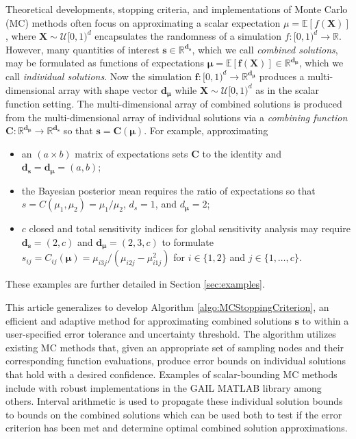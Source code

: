 \documentclass[graybox]{svmult}
\begin{document}
Theoretical developments, stopping criteria, and implementations of Monte Carlo (MC) methods often focus on approximating a scalar expectation $\mu = \mathbb{E}[f(\boldsymbol{X})]$, where $\boldsymbol{X} \sim \mathcal{U}[0,1)^d$ encapsulates the randomness of a simulation $f: [0,1)^d \to \mathbb{R}$. However, many quantities of interest $\boldsymbol{s} \in \mathbb{R}^{\boldsymbol{d}_{\boldsymbol{s}}}$, which we call \emph{combined solutions}, may be formulated as functions of expectations $\boldsymbol{\mu} = \mathbb{E}[\boldsymbol{f}(\boldsymbol{X})] \in \mathbb{R}^{\boldsymbol{d}_{\boldsymbol{\mu}}}$, which we call \emph{individual solutions}. Now the simulation $\boldsymbol{f}: [0,1)^{d} \to \mathbb{R}^{\boldsymbol{d}_{\boldsymbol{\mu}}}$ produces a multi-dimensional array with shape vector $\boldsymbol{d}_{\boldsymbol{\mu}}$ while $\boldsymbol{X} \sim \mathcal{U}[0,1)^d$ as in the scalar function setting. The multi-dimensional array of combined solutions is produced from the multi-dimensional array of individual solutions via a \emph{combining function} $\boldsymbol{C}: \mathbb{R}^{\boldsymbol{d}_{\boldsymbol{\mu}}} \to \mathbb{R}^{\boldsymbol{d}_{\boldsymbol{s}}}$ so that $\boldsymbol{s} = \boldsymbol{C}(\boldsymbol{\mu})$.
For example, approximating
\begin{itemize}
    \item an $(a \times b)$ matrix of expectations sets $\boldsymbol{C}$ to the identity and $\boldsymbol{d}_{\boldsymbol{s}} = \boldsymbol{d}_{\boldsymbol{\mu}} = (a,b)$;
    \item the Bayesian posterior mean requires the ratio of expectations so that $s = C(\mu_1,\mu_2) = \mu_1/\mu_2$, $d_s = 1$, and $d_{\boldsymbol{\mu}} = 2$;
    \item $c$ closed and total sensitivity indices for global sensitivity analysis may require $\boldsymbol{d}_{\boldsymbol{s}} = (2,c)$ and $\boldsymbol{d}_{\boldsymbol{\mu}} = (2,3,c)$ to formulate $s_{ij} = C_{ij}(\boldsymbol{\mu}) =  \mu_{i3j}/(\mu_{i2j}-\mu_{i1j}^2)$ for $i \in \{1,2\}$ and $j \in \{1,\dots,c\}$.
\end{itemize}
These examples are further detailed in Section \ref{sec:examples}.

This article generalizes \cite{adaptive_qmc} to develop Algorithm \ref{algo:MCStoppingCriterion}, an efficient and adaptive method for approximating combined solutions $\boldsymbol{s}$ to within a user-specified error tolerance and uncertainty threshold. The algorithm utilizes existing MC  methods that, given an appropriate set of sampling nodes and their corresponding function evaluations, produce error bounds on individual solutions that hold with a desired confidence. Examples of scalar-bounding MC methods include \cite{cubmcg,cubqmclattice,cubqmcsobol,cubqmcbayes_thesis,cubqmcbayeslattice} with robust implementations in the GAIL MATLAB library \cite{ChoEtal21a,hickernell2018monte} among others. Interval arithmetic is used to propagate these individual solution bounds to bounds on the combined solutions which can be used both to test if the error criterion has been met and determine optimal combined solution approximations. 
\end{document}
